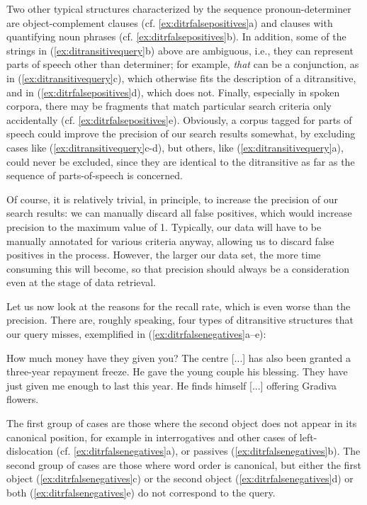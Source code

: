 Two other typical structures characterized by the sequence pronoun\hyp{}determiner are object\hyp{}complement clauses (cf. \ref{ex:ditrfalsepositives}a) and clauses with quantifying noun phrases (cf. \ref{ex:ditrfalsepositives}b). In addition, some of the strings in (\ref{ex:ditransitivequery}b) above are ambiguous, i.e., they can represent parts of speech other than determiner; for example, \textit{that} can be a conjunction, as in (\ref{ex:ditransitivequery}c), which otherwise fits the description of a ditransitive, and in (\ref{ex:ditrfalsepositives}d), which does not. Finally, especially in spoken corpora, there may be fragments that match particular search criteria only accidentally (cf. \ref{ex:ditrfalsepositives}e). Obviously, a corpus tagged for parts of speech could improve the precision of our search results somewhat, by excluding cases like (\ref{ex:ditransitivequery}c-d), but others, like (\ref{ex:ditransitivequery}a), could never be excluded, since they are identical to the ditransitive as far as the sequence of parts-of-speech is concerned.

Of course, it is relatively trivial, in principle, to increase the precision of our search results: we can manually discard all false positives, which would increase precision to the maximum value of 1. Typically, our data will have to be manually annotated for various criteria anyway, allowing us to discard false positives in the process. However, the larger our data set, the more time consuming this will become, so that precision should always be a consideration even at the stage of data retrieval.

Let us now look at the reasons for the recall rate, which is even worse than the precision. There are, roughly speaking, four types of ditransitive structures that our query misses, exemplified in (\ref{ex:ditrfalsenegatives}a--e):

\begin{exe}
\ex
\begin{xlist} 
\label{ex:ditrfalsenegatives}
\ex How much money have they given you?
\ex The centre [...] has also been granted a three-year repayment freeze.
\ex He gave the young couple his blessing.
\ex They have just given me enough to last this year.
\ex He finds himself [...] offering Gradiva flowers.
\end{xlist}
\end{exe}

The first group of cases are those where the second object does not appear in its canonical position, for example in interrogatives and other cases of left-dislocation (cf. \ref{ex:ditrfalsenegatives}a), or passives (\ref{ex:ditrfalsenegatives}b). The second group of cases are those where word order is canonical, but either the first object (\ref{ex:ditrfalsenegatives}c) or the second object (\ref{ex:ditrfalsenegatives}d) or both (\ref{ex:ditrfalsenegatives}e) do not correspond to the query.

